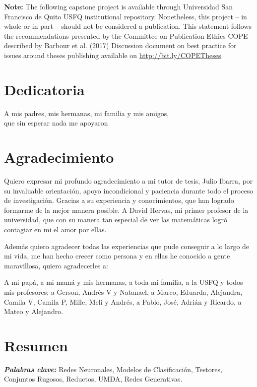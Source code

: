\documentclass[a4paper, 12pt]{report}
\begin{document}
\setlength{\parskip}{5mm}

\textbf{Note:} The following capstone project is available through Universidad San Francisco de Quito USFQ institutional repository. Nonetheless, this project – in whole or in part – should not be considered a publication. This statement follows the recommendations presented by the Committee on Publication Ethics COPE described by Barbour et al. (2017) Discussion document on best practice for issues around theses publishing available on \url{http://bit.ly/COPETheses}




\chapter*{Dedicatoria}
\begin{flushright}
  \Large A mis padres, mis hermanas, mi familia y mis amigos, \\
  que sin esperar nada me apoyaron
\end{flushright}


\chapter*{Agradecimiento}

Quiero expresar mi profundo agradecimiento a mi tutor de tesis,
Julio Ibarra, por su invaluable orientación, apoyo incondicional y
paciencia durante todo el proceso de investigación. Gracias a su experiencia y
conocimientos, que han logrado formarme de la mejor manera posible. 
A David Hervas, mi primer profesor de la universidad, que
con su manera tan especial de ver las matemáticas logró contagiar en mi el amor
por ellas.

Además quiero agradecer todas las experiencias que pude conseguir a lo
largo de mi vida, me han hecho crecer como persona y en ellas he conocido a
gente maravillosa, quiero agradecerles a:

A mi papá, a mi mamá y mis hermanas, a toda mi familia, a la USFQ y todos mis
profesores; a Gerson, Andrés V y Natanael, a Marco, Eduarda, Alejandra, Camila V,
Camila P, Mille, Meli y Andrés, a Pablo, José, Adrián y Ricardo, a Mateo y
Alejandro.

 
\chapter*{Resumen} 
\singlespacing


\noindent
\textbf{\textit{Palabras clave}:} Redes Neuronales, Modelos de Clasificación,
Testores, Conjuntos Rugosos, Reductos, UMDA, Redes Generativas.
 
\end{document}
